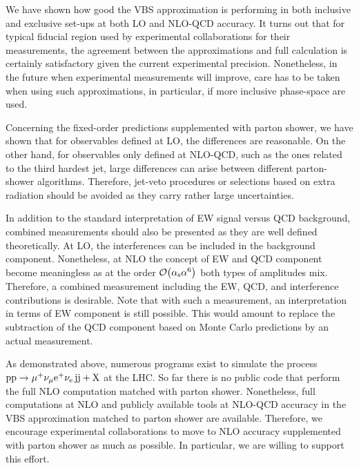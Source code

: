 We have shown how good the VBS approximation is performing in both inclusive and exclusive set-ups at both LO and NLO-QCD accuracy.
It turns out that for typical fiducial region used by experimental collaborations for their measurements, the agreement between the approximations and full calculation is certainly satisfactory given the current experimental precision.
Nonetheless, in the future when experimental measurements will improve, care has to be taken when using such approximations, in particular, if more inclusive phase-space are used.

Concerning the fixed-order predictions supplemented with parton shower, we have shown that for observables defined at LO, the differences are reasonable.
On the other hand, for observables only defined at NLO-QCD, such as the ones related to the third hardest jet, large differences can arise between different parton-shower algorithms.
Therefore, jet-veto procedures or selections based on extra radiation should be avoided as they carry rather large uncertainties.

In addition to the standard interpretation of EW signal versus QCD background, combined measurements should also be presented as they are well defined theoretically.
At LO, the interferences can be included in the background component.
Nonetheless, at NLO the concept of EW and QCD component become meaningless as at the order $\mathcal{O}{\left(\alpha_\text{s}\alpha^{6}\right)}$ both types of amplitudes mix.
Therefore, a combined measurement including the EW, QCD, and interference contributions is desirable.
Note that with such a measurement, an interpretation in terms of EW component is still possible.
This would amount to replace the subtraction of the QCD component based on Monte Carlo predictions by an actual measurement.

As demonstrated above, numerous programs exist to simulate the process $\text{p}\text{p}\to\mu^+\nu_\mu{\rm e}^+\nu_{\rm e}\,\text{j}\text{j}+\mathrm{X}$ at the LHC.
So far there is no public code that perform the full NLO computation matched with parton shower.
Nonetheless, full computations at NLO and publicly available tools at NLO-QCD accuracy in the VBS approximation matched to parton shower are available.
Therefore, we encourage experimental collaborations to move to NLO accuracy supplemented with parton shower as much as possible.
In particular, we are willing to support this effort. 

